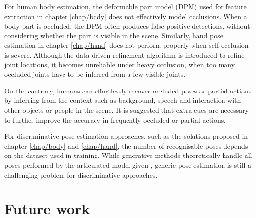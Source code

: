 For human body estimation, the deformable part model (DPM) used for feature extraction in chapter \ref{chap/body} does not effectively model occlusions. When a body part is occluded, the DPM often produces false positive detections, without considering whether the part is visible in the scene. Similarly, hand pose estimation in chapter \ref{chap/hand} does not perform properly when self-occlusion is severe. Although the data-driven refinement algorithm is introduced to refine joint locations, it becomes unreliable under heavy occlusion, when too many occluded joints have to be inferred from a few visible joints. 

On the contrary, humans can effortlessly recover occluded poses or partial actions by inferring from the context such as background, speech and interaction with other objects or people in the scene. It is suggested that extra cues are necessary to further improve the accuracy in frequently occluded or partial actions. 

For discriminative pose estimation approaches, such as the solutions proposed in chapter \ref{chap/body} and \ref{chap/hand}, the number of recognisable poses depends on the dataset used in training. While generative methods theoretically handle all poses performed by the articulated model given \cite{Oikonomidis2011}, generic pose estimation is still a challenging problem for discriminative approaches. 

\section{Future work}

